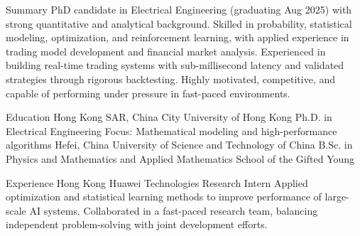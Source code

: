 \documentclass[caps, english]{financecv}
\begin{document}
\begin{cvsection}{Summary}
    PhD candidate in Electrical Engineering (graduating Aug 2025) with strong quantitative and analytical background. Skilled in probability, statistical modeling, optimization, and reinforcement learning, with applied experience in trading model development and financial market analysis. Experienced in building real-time trading systems with sub-millisecond latency and validated strategies through rigorous backtesting. Highly motivated, competitive, and capable of performing under pressure in fast-paced environments.
\end{cvsection}

\begin{cvsection}{Education}
    {Hong Kong SAR, China}
    {City University of Hong Kong}
    {}
    {Ph.D. in Electrical Engineering}
    {Focus: Mathematical modeling and high-performance algorithms}
    {}
    {}
    {Hefei, China}
    {University of Science and Technology of China}
    {}
    {B.Sc. in Physics and Mathematics and Applied Mathematics}
    {School of the Gifted Young}
    {}
    {}
\end{cvsection}

\begin{cvsection}{Experience}
    {Hong Kong}
    {Huawei Technologies}
    {Research Intern}
    {Applied optimization and statistical learning methods to improve performance of large-scale AI systems. Collaborated in a fast-paced research team, balancing independent problem-solving with joint development efforts.}
    {}
    {}
    {}
\end{cvsection}
\end{document}
